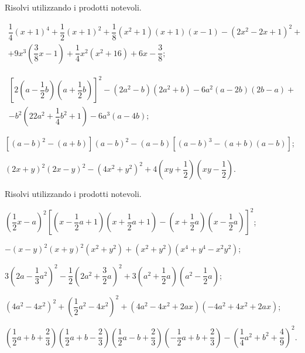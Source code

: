 \begin{esercizio}[\Ast]
 \label{ese:12.44}
Risolvi utilizzando i prodotti notevoli.
 \begin{enumeratea}
 \item
 \begin{multline*}
 \dfrac{1}{4}(x+1)^{4}+\dfrac{1}{2}(x+1)^{2}+\dfrac{1}{8}\left(x^{2}+1\right)(x+1)(x-1)-\left(2x^{2}-2x+1\right)^{2}+\\
 +9x^{3}\left(\dfrac{3}{8}x-1\right)+\dfrac{1}{4}x^{2}\left(x^{2}+16\right)+6x-\dfrac{3}{8};
 \end{multline*}
 \item
 \begin{multline*}
 \left[2\left(a-\dfrac{1}{2}b\right)\left(a+\dfrac{1}{2}b\right)\right]^{2}-\left(2a^{2}-b\right)\left(2a^{2}+b\right)-6a^{2}(a-2b)(2b-a)+\\
 -b^{2}\left(22a^{2}+\dfrac{1}{4}b^{2}+1\right)-6a^{3}(a-4b);
 \end{multline*}
 \item $\left[(a-b)^{2}-(a+b)\right](a-b)^{2}-(a-b)\left[(a-b)^{3}-(a+b)(a-b)\right]$;
 \item $(2x+y)^{2}(2x-y)^{2}-\left(4x^{2}+y^{2}\right)^{2}+4\left(xy+\dfrac{1}{2}\right)\left(xy-\dfrac{1}{2}\right)$.
 \end{enumeratea}
\end{esercizio}

\begin{esercizio}[\Ast]
 \label{ese:12.45}
Risolvi utilizzando i prodotti notevoli.
 \begin{enumeratea}
 \item $\left(\dfrac{1}{2}x-a\right)^{2}\left[\left(x-\dfrac{1}{2}a+1\right)\left(x+\dfrac{1}{2}a+1\right)-\left(x+\dfrac{1}{2}a\right)\left(x-\dfrac{1}{2}a\right)\right]^{2}$;
 \item $-(x-y)^2(x+y)^2\left(x^{2}+y^{2}\right)+\left(x^{2}+y^{2}\right)\left(x^{4}+y^{4}-x^{2}y^{2}\right)$;
 \item $3\left(2a-\dfrac{1}{3}a^{2}\right)^{2}-\dfrac{1}{2}\left(2a^{2}+\dfrac{3}{2}a\right)^{2}+3\left(a^{2}+\dfrac{1}{2}a\right)\left(a^{2}-\dfrac{1}{2}a\right)$;
 \item $\left(4a^{2}-4x^{2}\right)^{2}+\left(\dfrac{1}{2}a^{2}-4x^{2}\right)^{2}+\left(4a^{2}-4x^{2}+2ax\right)\left(-4a^{2}+4x^{2}+2ax\right)$;
 \item $\left(\dfrac{1}{2}a+b+\dfrac{2}{3}\right)\left(\dfrac{1}{2}a+b-\dfrac{2}{3}\right)\left(\dfrac{1}{2}a-b+\dfrac{2}{3}\right)\left(-\dfrac{1}{2}a+b+\dfrac{2}{3}\right)-\left(\dfrac{1}{4}a^{2}+b^{2}+\dfrac{4}{9}\right)^{2}$.
 \end{enumeratea}
\end{esercizio}

